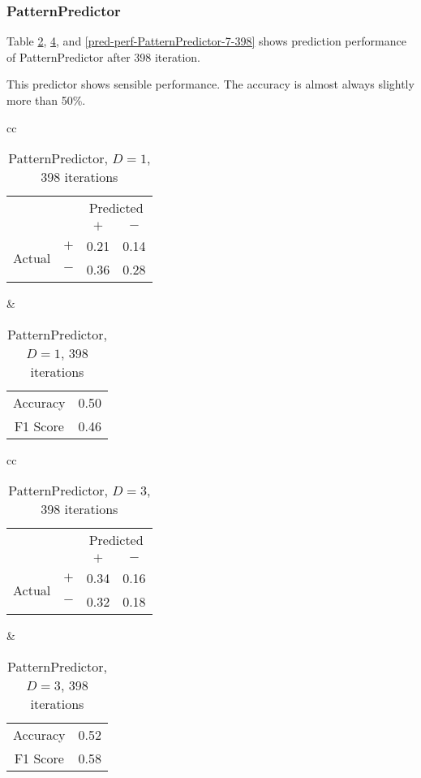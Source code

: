 \documentclass[twocolumn,10pt]{asme2ej}
\begin{document}
\subsubsection{PatternPredictor}

Table \ref{pred-perf-PatternPredictor-1-398},
\ref{pred-perf-PatternPredictor-3-398}, and
\ref{pred-perf-PatternPredictor-7-398} shows prediction performance of
PatternPredictor after 398 iteration.

This predictor shows sensible performance. The accuracy is almost
always slightly more than 50\%. 

\begin{table}
  \begin{tabular}{cc}
    \begin{tabular}{cc|cc}
      & & \multicolumn{2}{c}{Predicted} \\
      & & $+ $ & $-$ \\
      \hline
      \multirow{2}{*}{Actual}
      & $+$ & 0.21 & 0.14 \\
      & $-$ & 0.36 & 0.28 \\
      \hline
    \end{tabular}
    &
    \begin{tabular}{cc}
      Accuracy & 0.50 \\
      F1 Score & 0.46 \\
    \end{tabular}
  \end{tabular}
  \caption{PatternPredictor, $D=1$, 398 iterations}
  \label{pred-perf-PatternPredictor-1-398}
\end{table}


\begin{table}
  \begin{tabular}{cc}
    \begin{tabular}{cc|cc}
      & & \multicolumn{2}{c}{Predicted} \\
      & & $+ $ & $-$ \\
      \hline
      \multirow{2}{*}{Actual}
      & $+$ & 0.34 & 0.16 \\
      & $-$ & 0.32 & 0.18 \\
      \hline
    \end{tabular}
    &
    \begin{tabular}{cc}
      Accuracy & 0.52 \\
      F1 Score & 0.58 \\
    \end{tabular}
  \end{tabular}
  \caption{PatternPredictor, $D=3$, 398 iterations}
  \label{pred-perf-PatternPredictor-3-398}
\end{table}
\end{document}
